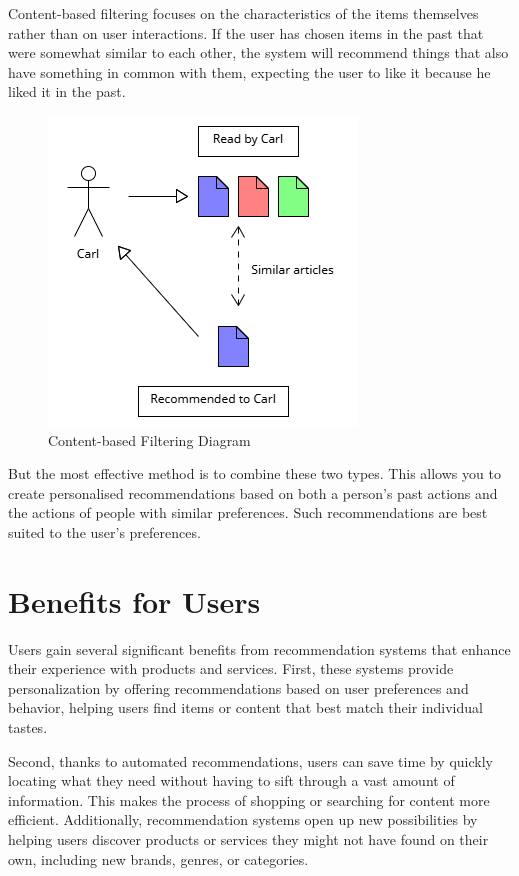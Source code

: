 \documentclass[10pt,twoside,slovak,a4paper]{article}
\begin{document}
\begin{enumerate}
Content-based filtering focuses on the characteristics of the items themselves rather than on user interactions. If the user has chosen items in the past that were somewhat similar to each other, the system will recommend things that also have something in common with them, expecting the user to like it because he liked it in the past.
\begin{figure}[!h]
    \centering
    \includegraphics[width=0.7\linewidth]{Diagram 4.png}
    \caption{Content-based Filtering Diagram}
    \label{fig:content-based}
\end{figure}
	
\end{enumerate}

But the most effective method is to combine these two types. This allows you to create personalised recommendations based on both a person's past actions and the actions of people with similar preferences. Such recommendations are best suited to the user's preferences.


\section{Benefits for Users} \label{Benefits for Users}
Users gain several significant benefits from recommendation systems that enhance their experience with products and services\cite{user}. First, these systems provide personalization by offering recommendations based on user preferences and behavior, helping users find items or content that best match their individual tastes.

Second, thanks to automated recommendations, users can save time by quickly locating what they need without having to sift through a vast amount of information. This makes the process of shopping or searching for content more efficient. Additionally, recommendation systems open up new possibilities by helping users discover products or services they might not have found on their own, including new brands, genres, or categories.
\end{document}
